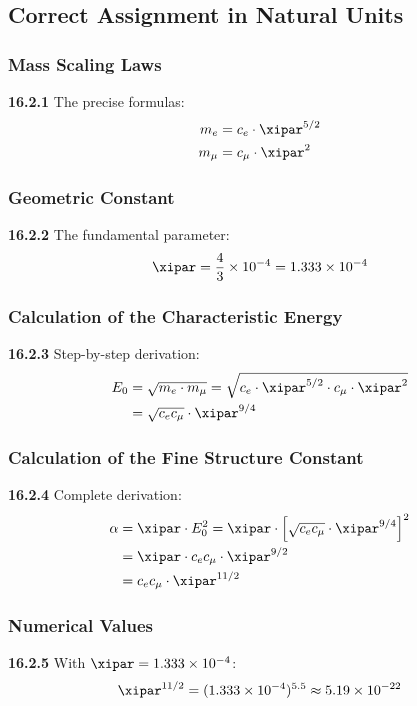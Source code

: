 \subsection{Correct Assignment in Natural Units}

\subsubsection{Mass Scaling Laws}
\noindent \textbf{16.2.1} The precise formulas:
\begin{align}
	m_e &= c_e \cdot \xipar^{5/2} \\
	m_\mu &= c_\mu \cdot \xipar^2
\end{align}

\subsubsection{Geometric Constant}
\noindent \textbf{16.2.2} The fundamental parameter:
\begin{equation}
	\xipar = \frac{4}{3} \times 10^{-4} = 1.333 \times 10^{-4}
\end{equation}

\subsubsection{Calculation of the Characteristic Energy}
\noindent \textbf{16.2.3} Step-by-step derivation:
\begin{align}
	E_0 &= \sqrt{m_e \cdot m_\mu} = \sqrt{c_e \cdot \xipar^{5/2} \cdot c_\mu \cdot \xipar^2} \\
	&= \sqrt{c_e c_\mu} \cdot \xipar^{9/4}
\end{align}

\subsubsection{Calculation of the Fine Structure Constant}
\noindent \textbf{16.2.4} Complete derivation:
\begin{align}
	\alpha &= \xipar \cdot E_0^2 = \xipar \cdot \left[ \sqrt{c_e c_\mu} \cdot \xipar^{9/4} \right]^2 \\
	&= \xipar \cdot c_e c_\mu \cdot \xipar^{9/2} \\
	&= c_e c_\mu \cdot \xipar^{11/2}
\end{align}

\subsubsection{Numerical Values}
\noindent \textbf{16.2.5} With $\xipar = 1.333 \times 10^{-4}$:
\begin{equation}
	\xipar^{11/2} = (1.333 \times 10^{-4})^{5.5} \approx 5.19 \times 10^{-22}
\end{equation}

